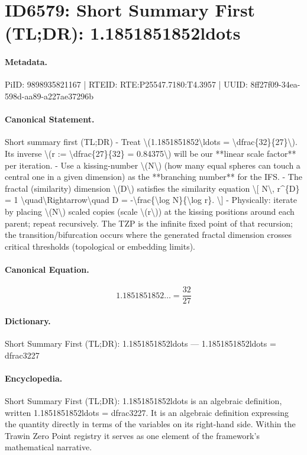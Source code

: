 \section*{ID6579: Short Summary First (TL;DR): 1.1851851852ldots}
\paragraph{Metadata.}
PiID: 9898935821167 | RTEID: RTE:P25547.7180:T4.3957 | UUID: 8ff27f09-34ea-598d-aa89-a227ae37296b

\paragraph{Canonical Statement.}
Short summary first (TL;DR) - Treat \textbackslash{}(1.1851851852\textbackslash{}ldots = \textbackslash{}dfrac\{32\}\{27\}\textbackslash{}). Its inverse \textbackslash{}(r := \textbackslash{}dfrac\{27\}\{32\} = 0.84375\textbackslash{}) will be our **linear scale factor** per iteration. - Use a kissing-number \textbackslash{}(N\textbackslash{}) (how many equal spheres can touch a central one in a given dimension) as the **branching number** for the IFS. - The fractal (similarity) dimension \textbackslash{}(D\textbackslash{}) satisfies the similarity equation \textbackslash{}[ N\textbackslash{}, r\textasciicircum{}\{D\} = 1 \textbackslash{}quad\textbackslash{}Rightarrow\textbackslash{}quad D = -\textbackslash{}frac\{\textbackslash{}log N\}\{\textbackslash{}log r\}. \textbackslash{}] - Physically: iterate by placing \textbackslash{}(N\textbackslash{}) scaled copies (scale \textbackslash{}(r\textbackslash{})) at the kissing positions around each parent; repeat recursively. The TZP is the infinite fixed point of that recursion; the transition/bifurcation occurs where the generated fractal dimension crosses critical thresholds (topological or embedding limits).

\paragraph{Canonical Equation.}
\[
1.1851851852\ldots = \dfrac{32}{27}
\]

\paragraph{Dictionary.}
Short Summary First (TL;DR): 1.1851851852ldots — 1.1851851852ldots = dfrac3227

\paragraph{Encyclopedia.}
Short Summary First (TL;DR): 1.1851851852ldots is an algebraic definition, written 1.1851851852ldots = dfrac3227. It is an algebraic definition expressing the quantity directly in terms of the variables on its right-hand side. Within the Trawin Zero Point registry it serves as one element of the framework's mathematical narrative.
